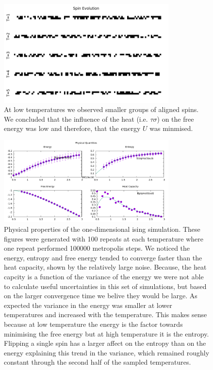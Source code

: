 \documentclass[a4paper]{article}
\begin{document}
    \begin{figure}
        \centering
        \includegraphics[width=0.8\textwidth]{pub/figures/q1a.pdf}
        \caption{At low temperatures we observed smaller groups of aligned %
            spins. We concluded that the influence of the heat (i.e. %
            \(\tau\sigma\)) on the free energy was low and therefore, that %
            the energy \(U\) was minmised.}
        \label{FIG1}
    \end{figure}

    \begin{figure}  
        \centering
        \includegraphics[width=0.8\textwidth]{pub/figures/q1c.pdf}
        \caption{Physical properties of the one-dimensional ising simulation. %
            These figures were generated with 100 repeats at each temperature %
            where one repeat performed 100000 metropolis steps. We noticed %
            the energy, entropy and free energy tended to converge faster than %
            the heat capacity, shown by the relatively large noise. Because, %
            the heat capcity is a function of the variance of the energy %
            we were not able to calculate useful uncertainties in this %
            set of simulations, but based on the larger convergence time we %
            belive they would be large. As expected the variance in the energy %
            was smaller at lower temperatures and increased with the %
            temperature. This makes sense because at low temperature the %
            energy is the factor towards minimising the free energy but at %
            high temperature it is the entropy. Flipping a single spin has %
            a larger affect on the entropy than on the energy explaining this %
            trend in the variance, which remained roughly constant through %
            the second half of the sampled temperatures.}
        \label{FIG2}
    \end{figure}
\end{document}
